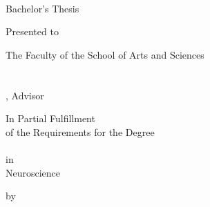 \begin{titlepage}
	\begin{center}
	    \large
	
	    \hfill
	
	    \vfill
	
	    \begingroup
	        \color{Maroon}\spacedallcaps{\myTitle} \\ \bigskip
	    \endgroup
	
	    \spacedlowsmallcaps{\mySubtitle}
	
	    \vfill
	    
	    Bachelor's Thesis \\ \medskip
	    
	    Presented to \\ \medskip
	    
	    The Faculty of the School of Arts and Sciences \\
	    \myUni \\
	    \myDepartment \\
	    \myProf, Advisor \\ \medskip
	    
	    In Partial Fulfillment \\
	    of the Requirements for the Degree \\
	    \myDegree \\
	    in \\
	    Neuroscience \\ \medskip
	    
	    by \\
	    \myName \\
	
		\vfill
	    \myTime
	
	    \vfill

	\end{center}
\end{titlepage}